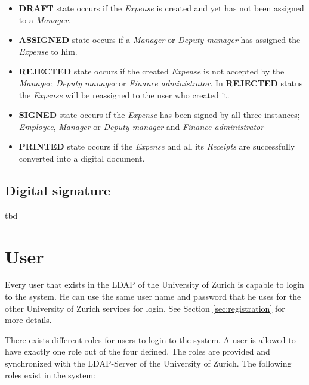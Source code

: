 \begin{itemize}
    \item \textbf{DRAFT} state occurs if the \textit{Expense} is created and yet has not been assigned to a \textit{Manager}.
    \item \textbf{ASSIGNED} state occurs if a \textit{Manager} or \textit{Deputy manager} has assigned the \textit{Expense} to him.
    \item \textbf{REJECTED} state occurs if the created \textit{Expense} is not accepted by the \textit{Manager}, \textit{Deputy manager} or \textit{Finance administrator}. In \textbf{REJECTED} status the \textit{Expense} will be reassigned to the user who created it.
    \item \textbf{SIGNED} state occurs if the \textit{Expense} has been signed by all three instances; \textit{Employee}, \textit{Manager} or \textit{Deputy manager} and \textit{Finance administrator}
    \item \textbf{PRINTED} state occurs if the \textit{Expense} and all its \textit{Receipts} are successfully converted into a digital document.
\end{itemize}

\subsection{Digital signature}
tbd

\section{User}

Every user that exists in the LDAP of the University of Zurich is capable to login to the system. He can use the same user name and password that he uses for the other University of Zurich services for login. See Section \ref{sec:registration} for more details.

There exists different roles for users to login to the system. A user is allowed to have exactly one role out of the four defined. The roles are provided and synchronized with the LDAP-Server of the University of Zurich. The following roles exist in the system:

